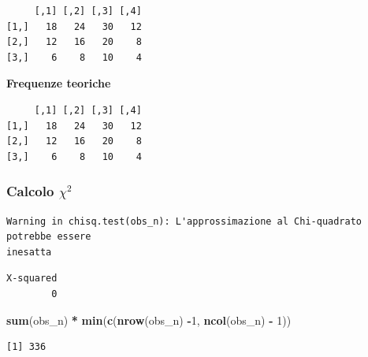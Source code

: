 \documentclass[
  a4paper,
  DIV=11,
  numbers=noendperiod]{scrreprt}
\newenvironment{Shaded}{\begin{snugshade}}{\end{snugshade}}
\newcommand{\DecValTok}[1]{\textcolor[rgb]{0.00,0.00,0.81}{#1}}
\newcommand{\FunctionTok}[1]{\textcolor[rgb]{0.13,0.29,0.53}{\textbf{#1}}}
\newcommand{\NormalTok}[1]{#1}
\newcommand{\SpecialCharTok}[1]{\textcolor[rgb]{0.81,0.36,0.00}{\textbf{#1}}}
\begin{document}
\begin{verbatim}
     [,1] [,2] [,3] [,4]
[1,]   18   24   30   12
[2,]   12   16   20    8
[3,]    6    8   10    4
\end{verbatim}

\textbf{Frequenze teoriche}

\begin{Shaded}
\end{Shaded}

\begin{verbatim}
     [,1] [,2] [,3] [,4]
[1,]   18   24   30   12
[2,]   12   16   20    8
[3,]    6    8   10    4
\end{verbatim}

\subsubsection{\texorpdfstring{Calcolo
\(\chi^2\)}{Calcolo \textbackslash chi\^{}2}}\label{calcolo-chi2}

\begin{Shaded}
\end{Shaded}

\begin{verbatim}
Warning in chisq.test(obs_n): L'approssimazione al Chi-quadrato potrebbe essere
inesatta
\end{verbatim}

\begin{verbatim}
X-squared 
        0 
\end{verbatim}

\begin{Shaded}
\begin{Highlighting}[]
\FunctionTok{sum}\NormalTok{(obs\_n) }\SpecialCharTok{*} \FunctionTok{min}\NormalTok{(}\FunctionTok{c}\NormalTok{(}\FunctionTok{nrow}\NormalTok{(obs\_n) }\SpecialCharTok{{-}}\DecValTok{1}\NormalTok{, }
                            \FunctionTok{ncol}\NormalTok{(obs\_n) }\SpecialCharTok{{-}} \DecValTok{1}\NormalTok{))}
\end{Highlighting}
\end{Shaded}

\begin{verbatim}
[1] 336
\end{verbatim}
\end{document}
